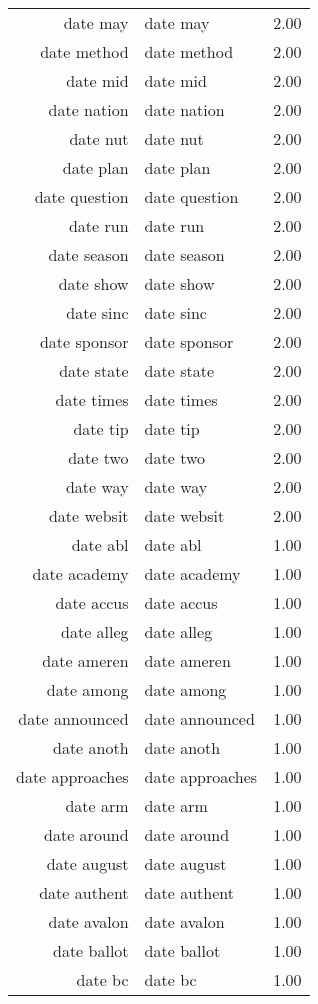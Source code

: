 \begin{table}[ht]
\begin{tabular}{rlr}
  date may & date may & 2.00 \\ 
  date method & date method & 2.00 \\ 
  date mid & date mid & 2.00 \\ 
  date nation & date nation & 2.00 \\ 
  date nut & date nut & 2.00 \\ 
  date plan & date plan & 2.00 \\ 
  date question & date question & 2.00 \\ 
  date run & date run & 2.00 \\ 
  date season & date season & 2.00 \\ 
  date show & date show & 2.00 \\ 
  date sinc & date sinc & 2.00 \\ 
  date sponsor & date sponsor & 2.00 \\ 
  date state & date state & 2.00 \\ 
  date times & date times & 2.00 \\ 
  date tip & date tip & 2.00 \\ 
  date two & date two & 2.00 \\ 
  date way & date way & 2.00 \\ 
  date websit & date websit & 2.00 \\ 
  date abl & date abl & 1.00 \\ 
  date academy & date academy & 1.00 \\ 
  date accus & date accus & 1.00 \\ 
  date alleg & date alleg & 1.00 \\ 
  date ameren & date ameren & 1.00 \\ 
  date among & date among & 1.00 \\ 
  date announced & date announced & 1.00 \\ 
  date anoth & date anoth & 1.00 \\ 
  date approaches & date approaches & 1.00 \\ 
  date arm & date arm & 1.00 \\ 
  date around & date around & 1.00 \\ 
  date august & date august & 1.00 \\ 
  date authent & date authent & 1.00 \\ 
  date avalon & date avalon & 1.00 \\ 
  date ballot & date ballot & 1.00 \\ 
  date bc & date bc & 1.00 \\ 

\end{tabular}
\end{table}
